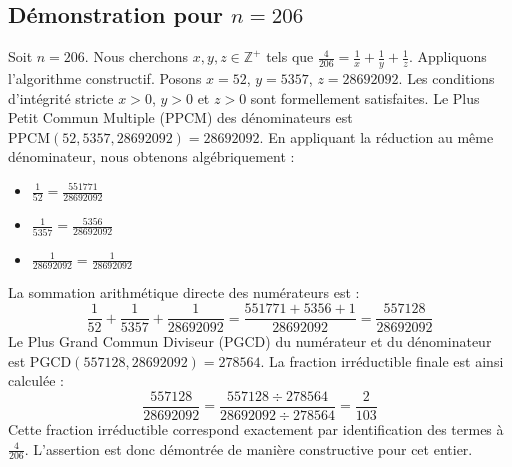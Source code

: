 \documentclass[11pt,a4paper]{article}
\begin{document}
\subsection{Démonstration pour $n = 206$}
Soit $n = 206$. Nous cherchons $x, y, z \in \mathbb{Z}^{+}$ tels que $\frac{4}{206} = \frac{1}{x} + \frac{1}{y} + \frac{1}{z}$.
Appliquons l'algorithme constructif. Posons $x = 52$, $y = 5357$, $z = 28692092$.
Les conditions d'intégrité stricte $x > 0$, $y > 0$ et $z > 0$ sont formellement satisfaites.
Le Plus Petit Commun Multiple (PPCM) des dénominateurs est $\text{PPCM}(52, 5357, 28692092) = 28692092$.
En appliquant la réduction au même dénominateur, nous obtenons algébriquement :
\begin{itemize}
    \item $\frac{1}{52} = \frac{551771}{28692092}$
    \item $\frac{1}{5357} = \frac{5356}{28692092}$
    \item $\frac{1}{28692092} = \frac{1}{28692092}$
\end{itemize}
La sommation arithmétique directe des numérateurs est :
$$ \frac{1}{52} + \frac{1}{5357} + \frac{1}{28692092} = \frac{551771 + 5356 + 1}{28692092} = \frac{557128}{28692092} $$
Le Plus Grand Commun Diviseur (PGCD) du numérateur et du dénominateur est $\text{PGCD}(557128, 28692092) = 278564$.
La fraction irréductible finale est ainsi calculée :
$$ \frac{557128}{28692092} = \frac{557128 \div 278564}{28692092 \div 278564} = \frac{2}{103} $$
Cette fraction irréductible correspond exactement par identification des termes à $\frac{4}{206}$. L'assertion est donc démontrée de manière constructive pour cet entier.
\end{document}

